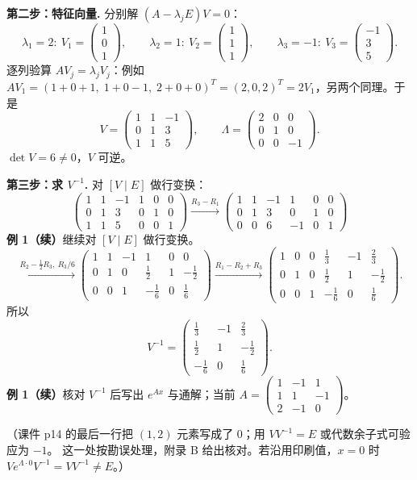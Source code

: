 \documentclass[11pt]{ctexart}
\newcommand{\pmat}[1]{\begin{pmatrix}#1\end{pmatrix}}
\begin{document}
\textbf{第二步：特征向量.} 分别解 $(A-\lambda_jE)V=0$：
\[
\lambda_1=2:\ V_1=\pmat{1\\0\\1},\qquad
\lambda_2=1:\ V_2=\pmat{1\\1\\1},\qquad
\lambda_3=-1:\ V_3=\pmat{-1\\3\\5}.
\]
逐列验算 $AV_j=\lambda_jV_j$：例如
$AV_1=(1+0+1,\;1+0-1,\;2+0+0)^T=(2,0,2)^T=2V_1$，另两个同理。于是
\[
V=\pmat{1&1&-1\\0&1&3\\1&1&5},\qquad
\Lambda=\pmat{2&0&0\\0&1&0\\0&0&-1}.
\]
$\det V=6\ne0$，$V$ 可逆。

\textbf{第三步：求 $V^{-1}$.} 对 $[V\mid E]$ 做行变换：
\[
\left(\begin{array}{ccc|ccc}
1&1&-1&1&0&0\\
0&1&3&0&1&0\\
1&1&5&0&0&1
\end{array}\right)
\xrightarrow{R_3-R_1}
\left(\begin{array}{ccc|ccc}
1&1&-1&1&0&0\\
0&1&3&0&1&0\\
0&0&6&-1&0&1
\end{array}\right)
\]
\clearpage
\noindent\textbf{例 1（续）}\quad 继续对 $[V\mid E]$ 做行变换。
\[
\xrightarrow{R_2-\frac12R_3,\ R_3/6}
\left(\begin{array}{ccc|ccc}
1&1&-1&1&0&0\\
0&1&0&\frac12&1&-\frac12\\
0&0&1&-\frac16&0&\frac16
\end{array}\right)
\xrightarrow{R_1-R_2+R_3}
\left(\begin{array}{ccc|ccc}
1&0&0&\frac13&-1&\frac23\\
0&1&0&\frac12&1&-\frac12\\
0&0&1&-\frac16&0&\frac16
\end{array}\right).
\]
所以
\[
V^{-1}=\pmat{\frac13&-1&\frac23\\[2pt]\frac12&1&-\frac12\\[2pt]-\frac16&0&\frac16}.
\]
\clearpage
\noindent\textbf{例 1（续）}\quad 核对 $V^{-1}$ 后写出 $e^{Ax}$ 与通解；当前
$A=\pmat{1&-1&1\\1&1&-1\\2&-1&0}$。

（课件 p14 的最后一行把 $(1,2)$ 元素写成了 $0$；用 $VV^{-1}=E$ 或代数余子式可验应为 $-1$。
这一处按勘误处理，附录 B 给出核对。若沿用印刷值，$x=0$ 时 $Ve^{\Lambda\cdot0}V^{-1}=VV^{-1}\ne E$。）
\end{document}
